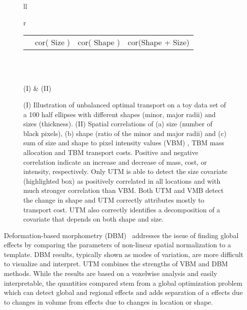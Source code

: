 \documentclass{llncs}
\begin{document}
\begin{figure}[t!]
\begin{tabular}{ll}
\begin{tabular}{r}
\begin{tabular}{l|c|c|c}
  \raisebox{-2mm}{\texttt{[image: cor-rx-ry-mass-mass]} }\\ \hline 
	& cor( Size ) 
	& cor( Shape )
	& cor(Shape + Size)
\end{tabular}\\
\end{tabular}\\
  (I) & (II) \\
\end{tabular}
\caption{\label{fig:cor-ellipse}
(I) Illustration of unbalanced optimal transport on a toy data set of a 100
half ellipses with different shapes (minor, major radii) and sizes (thickness).
(II) Spatial correlations of (a) size (number of black pixels), (b) shape
(ratio of the minor and major radii) and (c) sum of size and shape to pixel
intensity values (VBM) , TBM mass allocation and TBM transport costs. Positive
and negative correlation indicate an increase and decrease of mass, cost, or
intensity, respectively. Only UTM is able to detect the size covariate
(highlighted box) as positively correlated in all locations and with much
stronger correlation than VBM.  Both UTM and VMB detect the change in shape and
UTM correctly attributes mostly to transport cost. UTM also correctly identifies
a decomposition of a covariate that depends on both shape and size. 
\vspace{-7mm}
}
\end{figure}

Deformation-based morphometry (DBM)~\cite{ashburner1998identifying} addresses
the issue of finding global effects by comparing the parameters of non-linear
spatial normalization to a template.  DBM results, typically shown as modes of
variation, are more difficult to visualize and interpret.  UTM combines the
strengths of VBM and DBM methods.  While the results are based on a voxelwise
analysis and easily interpretable, the quantities compared stem from a global
optimization problem which can detect global and regional effects and adds
separation of a effects due to changes in volume from effects due to changes in
location or shape. 
\end{document}
